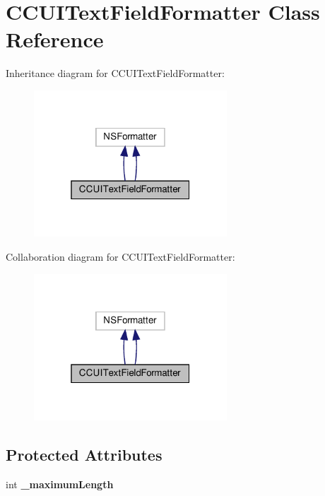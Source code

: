 \hypertarget{interfaceCCUITextFieldFormatter}{}\section{C\+C\+U\+I\+Text\+Field\+Formatter Class Reference}
\label{interfaceCCUITextFieldFormatter}


Inheritance diagram for C\+C\+U\+I\+Text\+Field\+Formatter\+:
\nopagebreak
\begin{figure}[H]
\begin{center}
\leavevmode
\includegraphics[width=205pt]{interfaceCCUITextFieldFormatter__inherit__graph}
\end{center}
\end{figure}


Collaboration diagram for C\+C\+U\+I\+Text\+Field\+Formatter\+:
\nopagebreak
\begin{figure}[H]
\begin{center}
\leavevmode
\includegraphics[width=205pt]{interfaceCCUITextFieldFormatter__coll__graph}
\end{center}
\end{figure}
\subsection*{Protected Attributes}
\begin{DoxyCompactItemize}
\item 
\mbox{\label{interfaceCCUITextFieldFormatter_acec5ec7f3bd4b34b69ac378d87e83d9f}} 
int {\bfseries \+\_\+maximum\+Length}
\end{DoxyCompactItemize}
